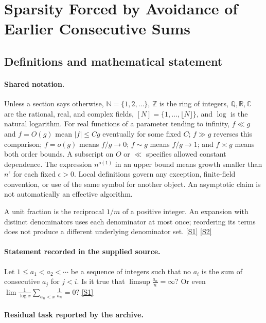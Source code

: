 \documentclass[11pt,a4paper]{article}
\newcommand{\N}{\mathbb{N}}
\newcommand{\Z}{\mathbb{Z}}
\newcommand{\Q}{\mathbb{Q}}
\newcommand{\R}{\mathbb{R}}
\newcommand{\C}{\mathbb{C}}
\newcommand{\sref}[2]{\hyperlink{source:#1:#2}{[S#2]}}
\begin{document}
\section{Sparsity Forced by Avoidance of Earlier Consecutive Sums}\label{statement}


\subsection{Definitions and mathematical statement}

\paragraph{Shared notation.}Unless a section says otherwise, $\N=\{1,2,\ldots\}$,
$\Z$ is the ring of integers, $\Q,\R,\C$ are the rational, real, and complex
fields, $[N]=\{1,\ldots,\lfloor N\rfloor\}$, and $\log$ is the natural
logarithm. For real functions of a parameter tending to infinity,
$f\ll g$ and $f=O(g)$ mean $|f|\leq Cg$ eventually for some fixed $C$;
$f\gg g$ reverses this comparison; $f=o(g)$ means $f/g\to0$;
$f\sim g$ means $f/g\to1$; and $f\asymp g$ means both order bounds.
A subscript on $O$ or $\ll$ specifies allowed constant dependence.
The expression $n^{o(1)}$ in an upper bound means growth smaller than
$n^\epsilon$ for each fixed $\epsilon>0$. Local definitions govern any
exception, finite-field convention, or use of the same symbol for another
object. An asymptotic claim is not automatically an effective algorithm.



A unit fraction is the reciprocal $1/m$ of a positive integer. An expansion with distinct denominators uses each denominator at most once; reordering its terms does not produce a different underlying denominator set. \sref{statement}{1} \sref{statement}{2}

\paragraph{Statement recorded in the supplied source.}
Let $1\leq a_1<a_2<\cdots$ be a sequence of integers such that no $a_i$ is the sum of consecutive $a_j$ for $j<i$. Is it true that $ \limsup \frac{a_n}{n}=\infty? $ Or even $ \lim \frac{1}{\log x}\sum_{a_n<x}\frac{1}{a_n}=0? $ \sref{statement}{1}

\paragraph{Residual task reported by the archive.}
\end{document}
